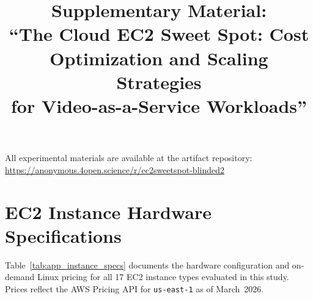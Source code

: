 \documentclass[conference]{IEEEtran}
\begin{document}
\title{Supplementary Material:\\``The Cloud EC2 Sweet Spot: Cost Optimization and Scaling Strategies\\for Video-as-a-Service Workloads''}

\maketitle

\tableofcontents

\bigskip\noindent
All experimental materials are available at the artifact repository:\\
\url{https://anonymous.4open.science/r/ec2sweetspot-blinded2}

\section{EC2 Instance Hardware Specifications}
\label{app:specs}

Table~\ref{tab:app_instance_specs} documents the hardware configuration and
on-demand Linux pricing for all 17 EC2 instance types evaluated in this study.
Prices reflect the AWS Pricing API for \texttt{us-east-1} as of March~2026.
\end{document}
